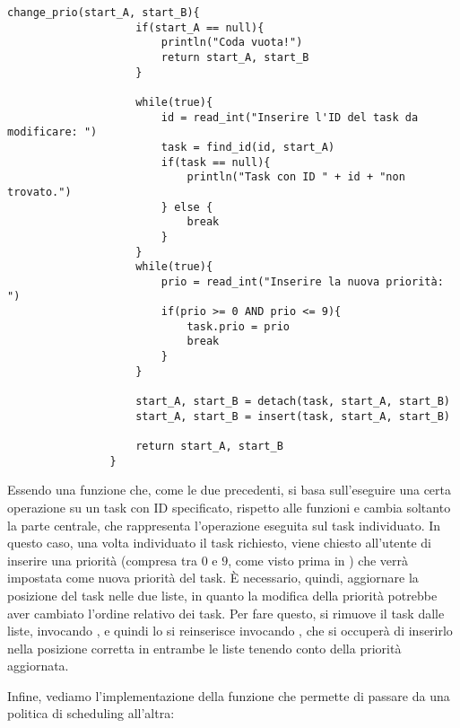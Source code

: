         \begin{center}
            \begin{lstlisting}[language=pseudo, gobble=14]
                change_prio(start_A, start_B){
                    if(start_A == null){
                        println("Coda vuota!")
                        return start_A, start_B
                    }
                    
                    while(true){
                        id = read_int("Inserire l'ID del task da modificare: ")
                        task = find_id(id, start_A)
                        if(task == null){
                            println("Task con ID " + id + "non trovato.")
                        } else {
                            break
                        }
                    }
                    while(true){
                        prio = read_int("Inserire la nuova priorità: ")
                        if(prio >= 0 AND prio <= 9){
                            task.prio = prio
                            break
                        }
                    }
                    
                    start_A, start_B = detach(task, start_A, start_B)
                    start_A, start_B = insert(task, start_A, start_B)
                    
                    return start_A, start_B
                }\end{lstlisting}
        \end{center}
        
        Essendo  una funzione che, come le due precedenti, si basa sull'eseguire una certa operazione su un task con ID specificato, rispetto alle funzioni  e  cambia soltanto la parte centrale, che rappresenta l'operazione eseguita sul task individuato. In questo caso, una volta individuato il task richiesto, viene chiesto all'utente di inserire una priorità (compresa tra $0$ e $9$, come visto prima in ) che verrà impostata come nuova priorità del task. È necessario, quindi, aggiornare la posizione del task nelle due liste, in quanto la modifica della priorità potrebbe aver cambiato l'ordine relativo dei task. Per fare questo, si rimuove il task dalle liste, invocando , e quindi lo si reinserisce invocando , che si occuperà di inserirlo nella posizione corretta in entrambe le liste tenendo conto della priorità aggiornata.
        
        Infine, vediamo l'implementazione della funzione che permette di passare da una politica di scheduling all'altra:
        
